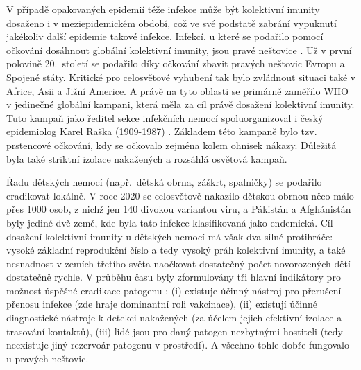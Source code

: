 V případě opakovaných epidemií téže infekce může být kolektivní imunity dosaženo i v meziepidemickém období, což ve své podstatě zabrání vypuknutí jakékoliv další epidemie takové infekce. Infekcí, u které se podařilo pomocí očkování dosáhnout globální kolektivní imunity, jsou pravé neštovice \cite{smallpox1}. Už v první polovině 20.\ století se podařilo díky očkování zbavit pravých neštovic Evropu a Spojené státy. Kritické pro celosvětové vyhubení tak bylo zvládnout situaci také v Africe, Asii a Jižní Americe. A právě na tyto oblasti se primárně zaměřilo WHO v jedinečné globální kampani, která měla za cíl právě dosažení kolektivní imunity. Tuto kampaň jako ředitel sekce infekčních nemocí spoluorganizoval i český epidemiolog Karel Raška (1909-1987) \cite{smallpox2}. Základem této kampaně bylo tzv. prstencové očkování, kdy se očkovalo zejména kolem ohnisek nákazy. Důležitá byla také striktní izolace nakažených a rozsáhlá osvětová kampaň.

Řadu dětských nemocí (např.\ dětská obrna, záškrt, spalničky) se podařilo eradikovat lokálně. V roce 2020 se celosvětově nakazilo dětskou obrnou něco málo přes 1000 osob, z nichž jen 140 divokou variantou viru, a Pákistán a Afghánistán byly jediné dvě země, kde byla tato infekce klasifikovaná jako endemická. Cíl dosažení kolektivní imunity u dětských nemocí má však dva silné protihráče: vysoké základní reprodukční číslo a tedy vysoký práh kolektivní imunity, a také nesnadnost v zemích třetího světa naočkovat dostatečný počet novorozených dětí dostatečně rychle. V průběhu času byly zformulovány tři hlavní indikátory pro možnost úspěšné eradikace patogenu \cite{Dowdle1999}: (i) existuje účinný nástroj pro přerušení přenosu infekce (zde hraje dominantní roli vakcinace), (ii) existují účinné diagnostické nástroje k detekci nakažených (za účelem jejich efektivní izolace a trasování kontaktů), (iii) lidé jsou pro daný patogen nezbytnými hostiteli (tedy neexistuje jiný rezervoár patogenu v prostředí). A všechno tohle dobře fungovalo u pravých neštovic.

